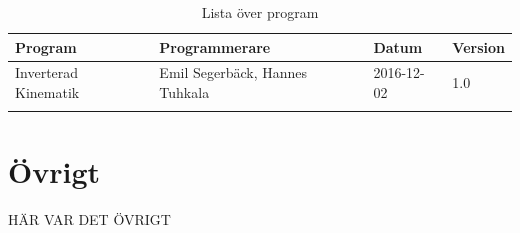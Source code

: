 \documentclass[a4paper,titlepage,12pt]{article}
\begin{document}
	\begin{longtable}[c]{l l l l}
		\textbf{Program} & \textbf{Programmerare} & \textbf{Datum}& \textbf{Version} \\ \midrule
		Inverterad Kinematik & Emil Segerbäck, Hannes Tuhkala & 2016-12-02 & 1.0 \\
		
		\caption{Lista över program \label{table:programlisting}}
	\end{longtable}
	
	\section{Övrigt}
	HÄR VAR DET ÖVRIGT
	
	
\end{document}
